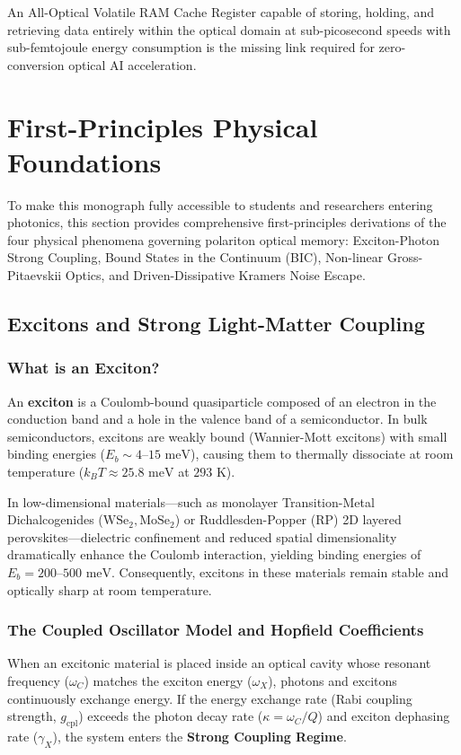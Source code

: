 \documentclass[11pt,a4paper]{article}
\begin{document}
An All-Optical Volatile RAM Cache Register capable of storing, holding, and retrieving data entirely within the optical domain at sub-picosecond speeds with sub-femtojoule energy consumption is the missing link required for zero-conversion optical AI acceleration.

\section{First-Principles Physical Foundations}

To make this monograph fully accessible to students and researchers entering photonics, this section provides comprehensive first-principles derivations of the four physical phenomena governing polariton optical memory: Exciton-Photon Strong Coupling, Bound States in the Continuum (BIC), Non-linear Gross-Pitaevskii Optics, and Driven-Dissipative Kramers Noise Escape.

\subsection{Excitons and Strong Light-Matter Coupling}

\subsubsection{What is an Exciton?}
An \textbf{exciton} is a Coulomb-bound quasiparticle composed of an electron in the conduction band and a hole in the valence band of a semiconductor. In bulk semiconductors, excitons are weakly bound (Wannier-Mott excitons) with small binding energies ($E_b \sim 4\text{--}15\text{ meV}$), causing them to thermally dissociate at room temperature ($k_B T \approx 25.8\text{ meV}$ at $293\text{ K}$).

In low-dimensional materials---such as monolayer Transition-Metal Dichalcogenides ($\text{WSe}_2, \text{MoSe}_2$) or Ruddlesden-Popper (RP) 2D layered perovskites---dielectric confinement and reduced spatial dimensionality dramatically enhance the Coulomb interaction, yielding binding energies of $E_b = 200\text{--}500\text{ meV}$. Consequently, excitons in these materials remain stable and optically sharp at room temperature.

\subsubsection{The Coupled Oscillator Model and Hopfield Coefficients}
When an excitonic material is placed inside an optical cavity whose resonant frequency ($\omega_C$) matches the exciton energy ($\omega_X$), photons and excitons continuously exchange energy. If the energy exchange rate (Rabi coupling strength, $g_{\text{cpl}}$) exceeds the photon decay rate ($\kappa = \omega_C / Q$) and exciton dephasing rate ($\gamma_X$), the system enters the \textbf{Strong Coupling Regime}.
\end{document}
